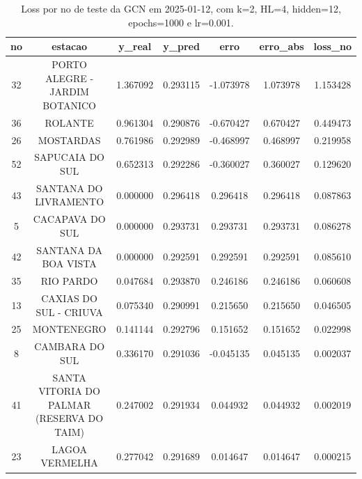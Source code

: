 \begin{table}[h]
\centering
\caption{Loss por no de teste da GCN em 2025-01-12, com k=2, HL=4, hidden=12, epochs=1000 e lr=0.001.}
\label{tab:gcn_loss_k2_hl4_h12_e1000_d20250112}
\begin{tabular}{ccccccc}
\toprule
no & estacao & y\_real & y\_pred & erro & erro\_abs & loss\_no \\
\midrule
32 & PORTO ALEGRE - JARDIM BOTANICO & 1.367092 & 0.293115 & -1.073978 & 1.073978 & 1.153428 \\
36 & ROLANTE & 0.961304 & 0.290876 & -0.670427 & 0.670427 & 0.449473 \\
26 & MOSTARDAS & 0.761986 & 0.292989 & -0.468997 & 0.468997 & 0.219958 \\
52 & SAPUCAIA DO SUL & 0.652313 & 0.292286 & -0.360027 & 0.360027 & 0.129620 \\
43 & SANTANA DO LIVRAMENTO & 0.000000 & 0.296418 & 0.296418 & 0.296418 & 0.087863 \\
5 & CACAPAVA DO SUL & 0.000000 & 0.293731 & 0.293731 & 0.293731 & 0.086278 \\
42 & SANTANA DA BOA VISTA & 0.000000 & 0.292591 & 0.292591 & 0.292591 & 0.085610 \\
35 & RIO PARDO & 0.047684 & 0.293870 & 0.246186 & 0.246186 & 0.060608 \\
13 & CAXIAS DO SUL - CRIUVA & 0.075340 & 0.290991 & 0.215650 & 0.215650 & 0.046505 \\
25 & MONTENEGRO & 0.141144 & 0.292796 & 0.151652 & 0.151652 & 0.022998 \\
8 & CAMBARA DO SUL & 0.336170 & 0.291036 & -0.045135 & 0.045135 & 0.002037 \\
41 & SANTA VITORIA DO PALMAR (RESERVA DO TAIM) & 0.247002 & 0.291934 & 0.044932 & 0.044932 & 0.002019 \\
23 & LAGOA VERMELHA & 0.277042 & 0.291689 & 0.014647 & 0.014647 & 0.000215 \\
\bottomrule
\end{tabular}
\end{table}
